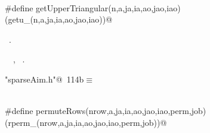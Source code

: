 \documentclass{article}
\begin{document}
\begin{description}
\begin{flushleft}
\begin{minipage}{\linewidth}
\vspace{-1ex}
\begin{list}{}{} \item
\mbox{}\verb@@\\
\mbox{}\verb@#define getUpperTriangular(n,a,ja,ia,ao,jao,iao)\@\\
\mbox{}\verb@(getu_(n,a,ja,ia,ao,jao,iao))@\\
\mbox{}\verb@@{\NWsep}
\end{list}
\vspace{-1.5ex}
\footnotesize
\begin{list}{}{\setlength{\itemsep}{-\parsep}\setlength{\itemindent}{-\leftmargin}}
\item \NWtxtFileDefBy\ .
\item \NWtxtIdentsUsed\nobreak\  \verb@ao@\nobreak\ , \verb@ia@\nobreak\ .
\item{}
\end{list}
\end{minipage}\vspace{4ex}
\end{flushleft}
\item[ permute rows B= P A ]
\begin{flushleft} \small
\begin{minipage}{\linewidth}\label{scrap205}\raggedright\small
{} \verb@"sparseAim.h"@\nobreak\ {\footnotesize {114b}}$\equiv$
\vspace{-1ex}
\begin{list}{}{} \item
\mbox{}\verb@@\\
\mbox{}\verb@#define permuteRows(nrow,a,ja,ia,ao,jao,iao,perm,job) \@\\
\mbox{}\verb@(rperm_(nrow,a,ja,ia,ao,jao,iao,perm,job))@\\
\mbox{}\verb@@{\NWsep}
\end{list}
\vspace{-1.5ex}
\footnotesize

\end{minipage}
\end{flushleft}
\end{description}
\end{document}

